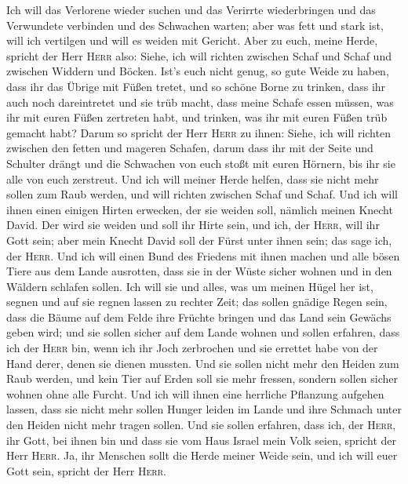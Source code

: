  Ich will das Verlorene wieder suchen und das Verirrte
wiederbringen und das Verwundete verbinden und des Schwachen warten;
aber was fett und stark ist, will ich vertilgen und will es weiden mit
Gericht.  Aber zu euch, meine Herde, spricht der Herr
\textsc{Herr} also: Siehe, ich will richten zwischen Schaf und Schaf und
zwischen Widdern und Böcken.  Ist's euch nicht genug, so
gute Weide zu haben, dass ihr das Übrige mit Füßen tretet, und so schöne
Borne zu trinken, dass ihr auch noch dareintretet und sie trüb macht,
 dass meine Schafe essen müssen, was ihr mit euren Füßen
zertreten habt, und trinken, was ihr mit euren Füßen trüb gemacht habt?
 Darum so spricht der Herr \textsc{Herr} zu ihnen: Siehe,
ich will richten zwischen den fetten und mageren Schafen,
 darum dass ihr mit der Seite und Schulter drängt und die
Schwachen von euch stoßt mit euren Hörnern, bis ihr sie alle von euch
zerstreut.  Und ich will meiner Herde helfen, dass sie
nicht mehr sollen zum Raub werden, und will richten zwischen Schaf und
Schaf.  Und ich will ihnen einen einigen Hirten erwecken,
der sie weiden soll, nämlich meinen Knecht David. Der wird sie weiden
und soll ihr Hirte sein,  und ich, der \textsc{Herr},
will ihr Gott sein; aber mein Knecht David soll der Fürst unter ihnen
sein; das sage ich, der \textsc{Herr}.  Und ich will
einen Bund des Friedens mit ihnen machen und alle bösen Tiere aus dem
Lande ausrotten, dass sie in der Wüste sicher wohnen und in den Wäldern
schlafen sollen.  Ich will sie und alles, was um meinen
Hügel her ist, segnen und auf sie regnen lassen zu rechter Zeit; das
sollen gnädige Regen sein,  dass die Bäume auf dem Felde
ihre Früchte bringen und das Land sein Gewächs geben wird; und sie
sollen sicher auf dem Lande wohnen und sollen erfahren, dass ich der
\textsc{Herr} bin, wenn ich ihr Joch zerbrochen und sie errettet habe
von der Hand derer, denen sie dienen mussten.  Und sie
sollen nicht mehr den Heiden zum Raub werden, und kein Tier auf Erden
soll sie mehr fressen, sondern sollen sicher wohnen ohne alle Furcht.
 Und ich will ihnen eine herrliche Pflanzung aufgehen
lassen, dass sie nicht mehr sollen Hunger leiden im Lande und ihre
Schmach unter den Heiden nicht mehr tragen sollen.  Und
sie sollen erfahren, dass ich, der \textsc{Herr}, ihr Gott, bei ihnen
bin und dass sie vom Haus Israel mein Volk seien, spricht der Herr
\textsc{Herr}.  Ja, ihr Menschen sollt die Herde meiner
Weide sein, und ich will euer Gott sein, spricht der Herr \textsc{Herr}.

